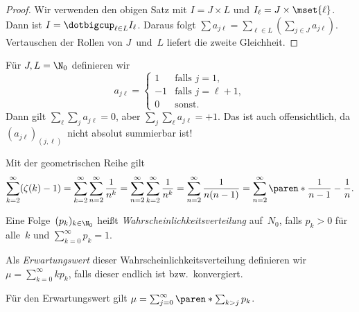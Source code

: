 \documentclass[a4paper]{article}
\begin{document}
\begin{proof}
    Wir verwenden den obigen Satz mit $I = J\times L$ und $I_\ell = J\times\mset{\ell}$. Dann ist $I = \dotbigcup_{\ell\in L} I_\ell$. Daraus folgt $\sum a_{j\ell} = \sum_{\ell\in L} (\sum_{j\in J} a_{j\ell})$. Vertauschen der Rollen von $J$~und~$L$ liefert die zweite Gleichheit.
\end{proof}

\begin{example}
    Für $J, L = \N_0$ definieren wir
    \begin{equation*}
        a_{j\ell} = \begin{cases}
            1 & \text{falls } j = 1, \\
            -1 & \text{falls } j = \ell+1, \\
            0 & \text{sonst}.
        \end{cases}
    \end{equation*}
    Dann gilt $\sum_\ell \sum_j a_{j\ell} = 0$, aber $\sum_j \sum_\ell a_{j\ell} = +1$. Das ist auch offensichtlich, da $(a_{j\ell})_{(j,\ell)}$~nicht absolut summierbar ist!
\end{example}

\begin{example}
    Mit der geometrischen Reihe gilt
    \begin{equation*}
        \sum_{k=2}^\infty (\zeta(k)-1) = \sum_{k=2}^\infty \sum_{n=2}^\infty \frac{1}{n^k} = \sum_{n=2}^\infty \sum_{k=2}^\infty \frac{1}{n^k} = \sum_{n=2}^\infty \frac{1}{n(n-1)} = \sum_{n=2}^\infty \paren*{\frac{1}{n-1} - \frac{1}{n}}.
    \end{equation*}
\end{example}

\begin{notation}
    Eine Folge~$(p_k)_{k\in\N_0}$ heißt \emph{Wahrscheinlichkeitsverteilung} auf~$N_0$, falls $p_k > 0$ für alle~$k$ und $\sum_{k=0}^\infty p_k = 1$.

    Als \emph{Erwartungswert} dieser Wahrscheinlichkeitsverteilung definieren wir $\mu = \sum_{k=0}^\infty kp_k$, falls dieser endlich ist bzw.\ konvergiert.
\end{notation}

\begin{theorem}
    Für den Erwartungswert gilt $\mu = \sum_{j=0}^\infty \paren*{\sum_{k>j} p_k}$.
\end{theorem}
\end{document}
